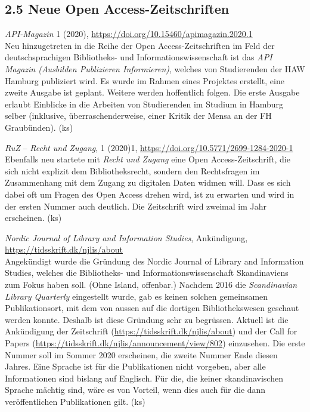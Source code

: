 \documentclass[a4paper,
fontsize=11pt,
oneside,
numbers=noperiodatend,
parskip=half-,
bibliography=totoc,
final
]{scrartcl}
\begin{document}
\hypertarget{neue-open-access-zeitschriften}{%
\subsection{2.5 Neue Open
Access-Zeitschriften}\label{neue-open-access-zeitschriften}}

\emph{API-Magazin} 1 (2020),
\url{https://doi.org/10.15460/apimagazin.2020.1}\\
Neu hinzugetreten in die Reihe der Open Access-Zeitschriften im Feld der
deutschsprachigen Bibliotheks- und Informationswissenschaft ist das
\emph{API Magazin (Ausbilden \textbar{} Publizieren \textbar{}
Informieren)}, welches von Studierenden der HAW Hamburg publiziert wird.
Es wurde im Rahmen eines Projektes erstellt, eine zweite Ausgabe ist
geplant. Weitere werden hoffentlich folgen. Die erste Ausgabe erlaubt
Einblicke in die Arbeiten von Studierenden im Studium in Hamburg selber
(inklusive, überraschenderweise, einer Kritik der Mensa an der FH
Graubünden). (ks)

\emph{RuZ} -- \emph{Recht und Zugang}, 1 (2020)1,
\url{https://doi.org/10.5771/2699-1284-2020-1}\\
Ebenfalls neu startete mit \emph{Recht und Zugang} eine Open
Access-Zeitschrift, die sich nicht explizit dem Bibliotheksrecht,
sondern den Rechtsfragen im Zusammenhang mit dem Zugang zu digitalen
Daten widmen will. Dass es sich dabei oft um Fragen des Open Access
drehen wird, ist zu erwarten und wird in der ersten Nummer auch
deutlich. Die Zeitschrift wird zweimal im Jahr erscheinen. (ks)

\emph{Nordic Journal of Library and Information Studies}, Ankündigung,
\url{https://tidsskrift.dk/njlis/about}\\
Angekündigt wurde die Gründung des Nordic Journal of Library and
Information Studies, welches die Bibliotheks- und
Informationswissenschaft Skandinaviens zum Fokus haben soll. (Ohne
Island, offenbar.) Nachdem 2016 die \emph{Scandinavian Library
Quarterly} eingestellt wurde, gab es keinen solchen gemeinsamen
Publikationsort, mit dem von aussen auf die dortigen Bibliothekswesen
geschaut werden konnte. Deshalb ist diese Gründung sehr zu begrüssen.
Aktuell ist die Ankündigung der Zeitschrift
(\url{https://tidsskrift.dk/njlis/about}) und der Call for Papers
(\url{https://tidsskrift.dk/njlis/announcement/view/802}) einzusehen.
Die erste Nummer soll im Sommer 2020 erscheinen, die zweite Nummer Ende
diesen Jahres. Eine Sprache ist für die Publikationen nicht vorgeben,
aber alle Informationen sind bislang auf Englisch. Für die, die keiner
skandinavischen Sprache mächtig sind, wäre es von Vorteil, wenn dies
auch für die dann veröffentlichen Publikationen gilt. (ks)
\end{document}
